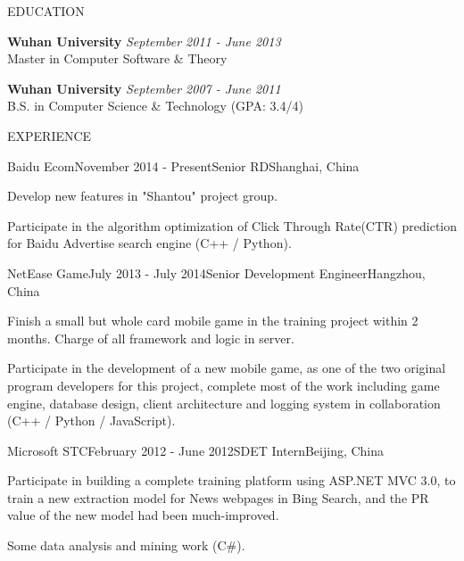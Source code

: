 \documentclass{resume} %
\begin{document}
\begin{rSection}{EDUCATION}

{\bf Wuhan University} \hfill {\em September 2011 - June 2013} \\
Master in Computer Software \& Theory
\vspace{0.3em}

{\bf Wuhan University} \hfill {\em September 2007 - June 2011} \\
B.S. in Computer Science \& Technology (GPA: 3.4/4)
\vspace{0.5em}

\end{rSection}

\begin{rSection}{EXPERIENCE}

\begin{rSubsection}{Baidu Ecom}{November 2014 - Present}{Senior RD}{Shanghai, China}
\item Develop new features in "Shantou" project group.
\item Participate in the algorithm optimization of Click Through Rate(CTR) prediction for Baidu Advertise search engine (C++ / Python).
\end{rSubsection}

\begin{rSubsection}{NetEase Game}{July 2013 - July 2014}{Senior Development Engineer}{Hangzhou, China}
\item Finish a small but whole card mobile game in the training project within 2 months. Charge of all framework and logic in server.
\item Participate in the development of a new mobile game, as one of the two original program developers for this project, complete most of the work including game engine, database design, client architecture and logging system in collaboration (C++ / Python / JavaScript).

\end{rSubsection}
\begin{rSubsection}{Microsoft STC}{February 2012 - June 2012}{SDET Intern}{Beijing, China}
\item Participate in building a complete training platform using ASP.NET MVC 3.0, to train a new extraction model for News webpages in Bing Search, and the PR value of the new model had been much-improved.
\item Some data analysis and mining work (C\#).
\end{rSubsection}

\end{rSection}
\end{document}
